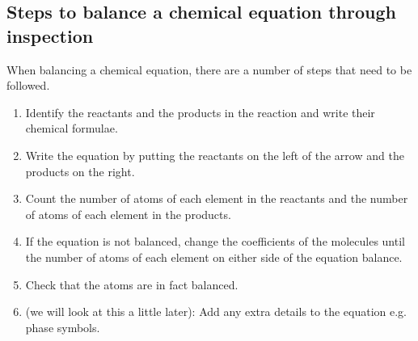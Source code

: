             \subsection*{Steps to balance a chemical equation through inspection}
            \nopagebreak
        \label{m38726*id63708}When balancing a chemical equation, there are a number of steps that need to be followed. 
\begin{enumerate}[noitemsep, label=\textbf{Step \arabic*}:]
\item Identify the reactants and the products in the reaction and write their chemical formulae.
\item Write the equation by putting the reactants on the left of the arrow and the products on the right.
\item Count the number of atoms of each element in the reactants and the number of atoms of each element in the products.
\item If the equation is not balanced, change the coefficients of the molecules until the number of atoms of each element on either side of the equation balance.
\item Check that the atoms are in fact balanced.
\item (we will look at this a little later): Add any extra details to the equation e.g. phase symbols.
\end{enumerate}

